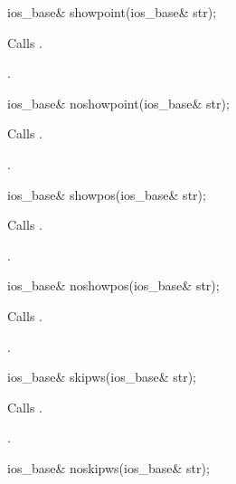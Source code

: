 %
\begin{itemdecl}
ios_base& showpoint(ios_base& str);
\end{itemdecl}

\begin{itemdescr}
\pnum
\effects
Calls
.

\pnum
\returns
{}.
\end{itemdescr}

%
\begin{itemdecl}
ios_base& noshowpoint(ios_base& str);
\end{itemdecl}

\begin{itemdescr}
\pnum
\effects
Calls
.

\pnum
\returns
{}.
\end{itemdescr}

%
\begin{itemdecl}
ios_base& showpos(ios_base& str);
\end{itemdecl}

\begin{itemdescr}
\pnum
\effects
Calls
.

\pnum
\returns
{}.
\end{itemdescr}

%
\begin{itemdecl}
ios_base& noshowpos(ios_base& str);
\end{itemdecl}

\begin{itemdescr}
\pnum
\effects
Calls
.

\pnum
\returns
{}.
\end{itemdescr}

%
\begin{itemdecl}
ios_base& skipws(ios_base& str);
\end{itemdecl}

\begin{itemdescr}
\pnum
\effects
Calls
.

\pnum
\returns
{}.
\end{itemdescr}

%
\begin{itemdecl}
ios_base& noskipws(ios_base& str);
\end{itemdecl}

